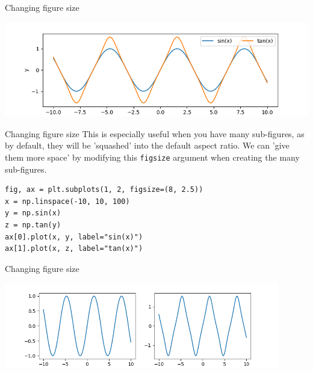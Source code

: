 \documentclass[10pt]{beamer}
\begin{document}
\begin{frame}[label={sec:org09712eb}]{Changing figure size}
\begin{center}
\includegraphics[width=.9\linewidth]{images/fig-size.png}
\end{center}
\end{frame}

\begin{frame}[label={sec:orgc9d57e6},fragile]{Changing figure size}
 This is especially useful when you have many sub-figures, as by default, they
will be 'squashed' into the default aspect ratio. We can 'give them more space'
by modifying this \texttt{figsize} argument when creating the many sub-figures.

\begin{verbatim}
fig, ax = plt.subplots(1, 2, figsize=(8, 2.5))
x = np.linspace(-10, 10, 100)
y = np.sin(x)
z = np.tan(y)
ax[0].plot(x, y, label="sin(x)")
ax[1].plot(x, z, label="tan(x)")
\end{verbatim}
\end{frame}

\begin{frame}[label={sec:org76d12fd}]{Changing figure size}
\begin{center}
\includegraphics[width=0.9\textwidth]{images/figsize-2.png}
\end{center}
\end{frame}
\end{document}
